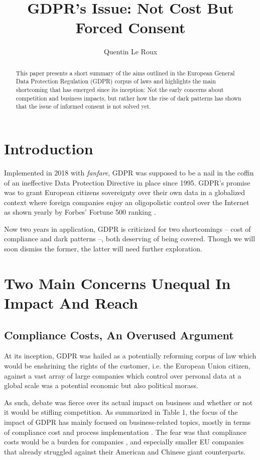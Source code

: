 \documentclass[runningheads]{llncs}
\begin{document}
%
\title{GDPR's Issue: Not Cost But Forced Consent}
% 
\author{Quentin Le Roux}
%
%
\maketitle
%
\begin{abstract}
This paper presents a short summary of the aims outlined in the European General Data Protection Regulation (GDPR) corpus of laws and highlights the main shortcoming that has emerged since its inception: Not the early concerns about competition and business impacts, but rather how the rise of dark patterns has shown that the issue of informed consent is not solved yet.
%
\end{abstract}
%
\section{Introduction}
Implemented in 2018 with \textit{fanfare}, GDPR was supposed to be a nail in the coffin of an ineffective Data Protection Directive \cite{ref1} in place since 1995. GDPR's promise was to grant European citizens sovereignty over their own data in a globalized context where foreign companies enjoy an oligopolistic control over the Internet as shown yearly by Forbes' Fortune 500 ranking \cite{ref2}.

Now two years in application, GDPR is criticized for two shortcomings -- cost of compliance and dark patterns --, both deserving of being covered. Though we will soon dismiss the former, the latter will need further exploration.

\section{Two Main Concerns Unequal In Impact And Reach}
\subsection{Compliance Costs, An Overused Argument}

At its inception, GDPR was hailed as a potentially reforming corpus of law which would be enshrining the rights of the customer, i.e. the European Union citizen, against a vast array of large companies which control over personal data at a global scale was a potential economic but also political morass.

As such, debate was fierce over its actual impact on business and whether or not it would be stifling competition. As summarized in Table 1, the focus of the impact of GDPR has mainly focused on business-related topics, mostly in terms of compliance cost and process implementation \cite{ref3}. The fear was that compliance costs would be a burden for companies \cite{ref4}, and especially smaller EU companies that already struggled against their American and Chinese giant counterparts.
\end{document}
